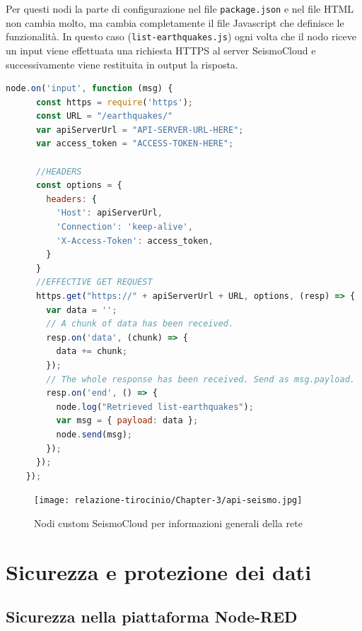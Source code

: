 \documentclass[a4paper,10pt]{memoir}
\begin{document}
Per questi nodi la parte di configurazione nel file \texttt{package.json} e nel file HTML non cambia molto, ma cambia completamente il file Javascript che definisce le funzionalità.
In questo caso (\texttt{list-earthquakes.js}) ogni volta che il nodo riceve un input viene effettuata una richiesta HTTPS al server SeismoCloud e successivamente viene restituita in output la risposta.
\begin{lstlisting}[language=Javascript,firstnumber=20]
    node.on('input', function (msg) {
      const https = require('https');
      const URL = "/earthquakes/"
      var apiServerUrl = "API-SERVER-URL-HERE";
      var access_token = "ACCESS-TOKEN-HERE";

      //HEADERS
      const options = {
        headers: {
          'Host': apiServerUrl,
          'Connection': 'keep-alive',
          'X-Access-Token': access_token,
        }
      }
      //EFFECTIVE GET REQUEST
      https.get("https://" + apiServerUrl + URL, options, (resp) => {
        var data = '';
        // A chunk of data has been received.
        resp.on('data', (chunk) => {
          data += chunk;
        });
        // The whole response has been received. Send as msg.payload.
        resp.on('end', () => {
          node.log("Retrieved list-earthquakes");
          var msg = { payload: data };
          node.send(msg);
        });
      });
    });
\end{lstlisting}

\begin{figure}[ht]
    \texttt{[image: relazione-tirocinio/Chapter-3/api-seismo.jpg]}
    \caption{Nodi custom SeismoCloud per informazioni generali della rete}
    \label{fig:api-seismo-nodes}
\end{figure}


\chapter{Sicurezza e protezione dei dati}

\section{Sicurezza nella piattaforma Node-RED}
\end{document}
